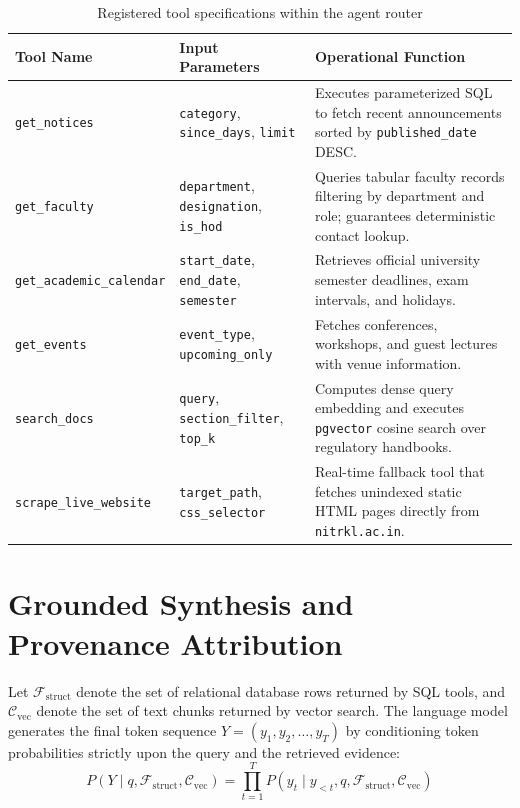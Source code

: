 \documentclass[12pt,a4paper]{report}
\begin{document}
\begin{table}[htbp]
\centering
\small
\caption{Registered tool specifications within the agent router}
\label{tab:tool_specs}
\begin{tabularx}{\textwidth}{llX}
\toprule
\textbf{Tool Name} & \textbf{Input Parameters} & \textbf{Operational Function} \\
\midrule
\texttt{get\_notices} & \texttt{category}, \texttt{since\_days}, \texttt{limit} & Executes parameterized SQL to fetch recent announcements sorted by \texttt{published\_date} DESC. \\
\addlinespace
\texttt{get\_faculty} & \texttt{department}, \texttt{designation}, \texttt{is\_hod} & Queries tabular faculty records filtering by department and role; guarantees deterministic contact lookup. \\
\addlinespace
\texttt{get\_academic\_calendar} & \texttt{start\_date}, \texttt{end\_date}, \texttt{semester} & Retrieves official university semester deadlines, exam intervals, and holidays. \\
\addlinespace
\texttt{get\_events} & \texttt{event\_type}, \texttt{upcoming\_only} & Fetches conferences, workshops, and guest lectures with venue information. \\
\addlinespace
\texttt{search\_docs} & \texttt{query}, \texttt{section\_filter}, \texttt{top\_k} & Computes dense query embedding and executes \texttt{pgvector} cosine search over regulatory handbooks. \\
\addlinespace
\texttt{scrape\_live\_website} & \texttt{target\_path}, \texttt{css\_selector} & Real-time fallback tool that fetches unindexed static HTML pages directly from \texttt{nitrkl.ac.in}. \\
\bottomrule
\end{tabularx}
\end{table}

\section{Grounded Synthesis and Provenance Attribution}
Let $\mathcal{F}_{\text{struct}}$ denote the set of relational database rows returned by SQL tools, and $\mathcal{C}_{\text{vec}}$ denote the set of text chunks returned by vector search. The language model generates the final token sequence $Y = (y_1, y_2, \dots, y_T)$ by conditioning token probabilities strictly upon the query and the retrieved evidence:
\begin{equation}
P(Y \mid q, \mathcal{F}_{\text{struct}}, \mathcal{C}_{\text{vec}}) = \prod_{t=1}^T P(y_t \mid y_{<t}, q, \mathcal{F}_{\text{struct}}, \mathcal{C}_{\text{vec}})
\end{equation}
\end{document}

